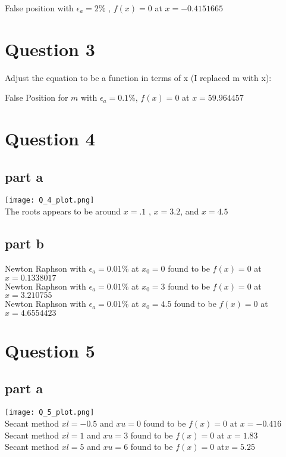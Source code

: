 \documentclass[11pt]{article} %
\begin{document}
False position with $\epsilon_a = 2\%$ , $f(x) = 0$ at {\boldmath$x = -0.4151665$}

\section{Question 3}

Adjust the equation to be a function in terms of x (I replaced m with x):
\begin{center}
{}
\end{center}


\begin{flushleft}
False Position for $m$ with $\epsilon_a = 0.1\%$, $f(x) = 0$ at $x = 59.964457$
\end{flushleft}

\section{Question 4}

\subsection{part a}

\texttt{[image: Q\_4\_plot.png]} \\
The roots appears to be around $x = .1$ , $x = 3.2$, and $x=4.5$

\subsection{part b}

Newton Raphson with $\epsilon_a = 0.01\%$ at $x_0 = 0$ found to be $ f(x) = 0$ at {\boldmath$x = 0.1338017$} \\
Newton Raphson with $\epsilon_a = 0.01\%$ at $x_0 = 3$ found to be $ f(x) = 0$ at {\boldmath$x = 3.210755$} \\
Newton Raphson with $\epsilon_a = 0.01\%$ at $x_0 = 4.5$ found to be $ f(x) = 0$ at {\boldmath$x = 4.6554423$}

\section{Question 5}

\subsection{part a}

\texttt{[image: Q\_5\_plot.png]} \\
Secant method $xl = -0.5$ and $xu = 0$ found to be $ f(x) = 0$ at {\boldmath$x = -0.416$} \\
Secant method $xl = 1$ and $xu = 3$ found to be $ f(x) = 0$ at {\boldmath$x = 1.83$} \\
Secant method $xl = 5$ and $xu = 6$ found to be $ f(x) = 0$ at{\boldmath$x = 5.25$} 
\end{document}
